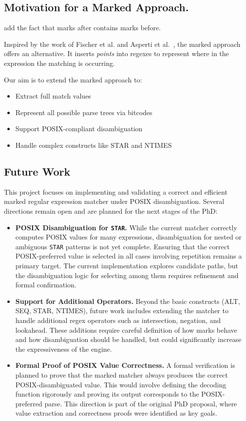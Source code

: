 \documentclass[12pt]{article}
\begin{document}
\subsection{Motivation for a Marked Approach.}
add the fact that marks after contains marks before.

Inspired by the work of Fischer et al. and Asperti et al.~\cite{Fischer2010, Asperti2010}, the marked approach offers an alternative. It inserts \emph{points} into regexes to represent where in the expression the matching is occurring.

Our aim is to extend the marked approach to:
\begin{itemize}
\item Extract full match values
\item Represent all possible parse trees via bitcodes
\item Support POSIX-compliant disambiguation
\item Handle complex constructs like STAR and NTIMES
\end{itemize}

\subsection{Future Work}
This project focuses on implementing and validating a correct and efficient marked regular expression matcher under POSIX disambiguation. Several directions remain open and are planned for the next stages of the PhD:

\begin{itemize}
\item \textbf{POSIX Disambiguation for \texttt{STAR}.}
While the current matcher correctly computes POSIX values for many expressions, disambiguation for nested or ambiguous \texttt{STAR} patterns is not yet complete. Ensuring that the correct POSIX-preferred value is selected in all cases involving repetition remains a primary target. The current implementation explores candidate paths, but the disambiguation logic for selecting among them requires refinement and formal confirmation.

\item \textbf{Support for Additional Operators.}
Beyond the basic constructs (ALT, SEQ, STAR, NTIMES), future work includes extending the matcher to handle additional regex operators such as intersection, negation, and lookahead. These additions require careful definition of how marks behave and how disambiguation should be handled, but could significantly increase the expressiveness of the engine.

\item \textbf{Formal Proof of POSIX Value Correctness.}
A formal verification is planned to prove that the marked matcher always produces the correct POSIX-disambiguated value. This would involve defining the decoding function rigorously and proving its output corresponds to the POSIX-preferred parse. This direction is part of the original PhD proposal, where value extraction and correctness proofs were identified as key goals.


\end{itemize}




\end{document}
